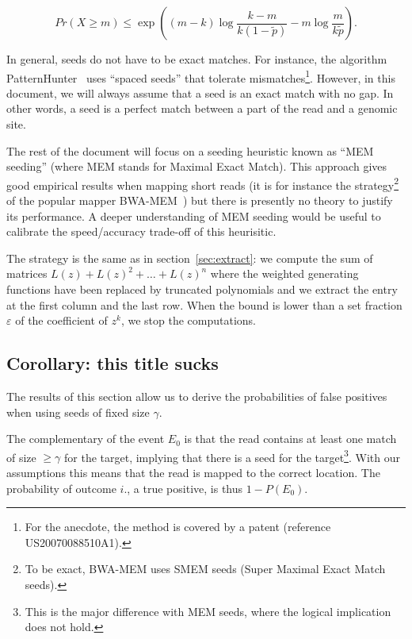 \documentclass{article}
\begin{document}
\begin{equation*}
Pr(X \geq m) \leq \exp \left( (m-k)\log \frac{k-m}{k(1-\tilde{p})} -m\log
\frac{m}{k\tilde{p}} \right).
\end{equation*}

In general, seeds do not have to be exact matches{}. For
instance, the algorithm PatternHunter~\cite{pmid11934743} uses ``spaced
seeds'' that tolerate mismatches\footnote{For the anecdote, the method is
covered by a patent (reference US20070088510A1).}. However, in this
document, we will always assume that a seed is an exact match with no gap.
In other words, a seed is a perfect match between a part of the read and a
genomic site.

The rest of the document will focus on a seeding heuristic known as ``MEM
seeding'' (where MEM stands for Maximal Exact Match). This approach gives
good empirical results when mapping short reads (it is for instance the
strategy\footnote{To be exact, BWA-MEM uses SMEM seeds (Super Maximal
Exact Match seeds).} of the popular mapper BWA-MEM~\cite{li2013aligning})
but there is presently no theory to justify its performance. A deeper
understanding of MEM seeding would be useful to calibrate the
speed/accuracy trade-off of this heurisitic.


The strategy is the same as in section~\ref{sec:extract}: we compute the
sum of matrices $L(z) + L(z)^2 + \ldots + L(z)^n$ where the weighted
generating functions have been replaced by truncated polynomials and we
extract the entry at the first column and the last row. When the bound is
lower than a set fraction $\varepsilon$ of the coefficient of $z^k$, we
stop the computations.

\subsection{Corollary: this title sucks}

The results of this section allow us to derive the probabilities of false
positives when using seeds of fixed size $\gamma$.

The complementary of the event $E_0$ is that the read contains at least
one match of size $\geq \gamma$ for the target, implying that there is a
seed for the target\footnote{This is the major difference with MEM seeds,
where the logical implication does not hold.}. With our assumptions this
means that the read is mapped to the correct location. The probability of
outcome $i.$, a true positive, is thus $1-P(E_0)$.
\end{document}
